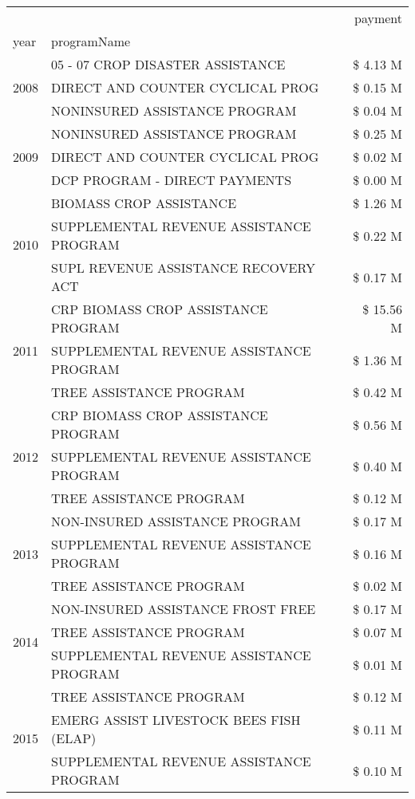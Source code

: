 \begin{tabular}{llr}
\toprule
 &  & payment \\
year & programName &  \\
\midrule
\multirow[t]{3}{*}{2008} & 05 - 07 CROP DISASTER ASSISTANCE & \$ 4.13 M \\
 & DIRECT AND COUNTER CYCLICAL PROG & \$ 0.15 M \\
 & NONINSURED ASSISTANCE PROGRAM & \$ 0.04 M \\
\cline{1-3}
\multirow[t]{3}{*}{2009} & NONINSURED ASSISTANCE PROGRAM & \$ 0.25 M \\
 & DIRECT AND COUNTER CYCLICAL PROG & \$ 0.02 M \\
 & DCP PROGRAM - DIRECT PAYMENTS & \$ 0.00 M \\
\cline{1-3}
\multirow[t]{3}{*}{2010} & BIOMASS CROP ASSISTANCE & \$ 1.26 M \\
 & SUPPLEMENTAL REVENUE ASSISTANCE PROGRAM & \$ 0.22 M \\
 & SUPL REVENUE ASSISTANCE RECOVERY ACT & \$ 0.17 M \\
\cline{1-3}
\multirow[t]{3}{*}{2011} & CRP BIOMASS CROP ASSISTANCE PROGRAM & \$ 15.56 M \\
 & SUPPLEMENTAL REVENUE ASSISTANCE PROGRAM & \$ 1.36 M \\
 & TREE ASSISTANCE PROGRAM & \$ 0.42 M \\
\cline{1-3}
\multirow[t]{3}{*}{2012} & CRP BIOMASS CROP ASSISTANCE PROGRAM & \$ 0.56 M \\
 & SUPPLEMENTAL REVENUE ASSISTANCE PROGRAM & \$ 0.40 M \\
 & TREE ASSISTANCE PROGRAM & \$ 0.12 M \\
\cline{1-3}
\multirow[t]{3}{*}{2013} & NON-INSURED ASSISTANCE PROGRAM & \$ 0.17 M \\
 & SUPPLEMENTAL REVENUE ASSISTANCE PROGRAM & \$ 0.16 M \\
 & TREE ASSISTANCE PROGRAM & \$ 0.02 M \\
\cline{1-3}
\multirow[t]{3}{*}{2014} & NON-INSURED ASSISTANCE FROST FREE & \$ 0.17 M \\
 & TREE ASSISTANCE PROGRAM & \$ 0.07 M \\
 & SUPPLEMENTAL REVENUE ASSISTANCE PROGRAM & \$ 0.01 M \\
\cline{1-3}
\multirow[t]{3}{*}{2015} & TREE ASSISTANCE PROGRAM & \$ 0.12 M \\
 & EMERG ASSIST LIVESTOCK BEES FISH (ELAP) & \$ 0.11 M \\
 & SUPPLEMENTAL REVENUE ASSISTANCE PROGRAM & \$ 0.10 M \\

\end{tabular}
